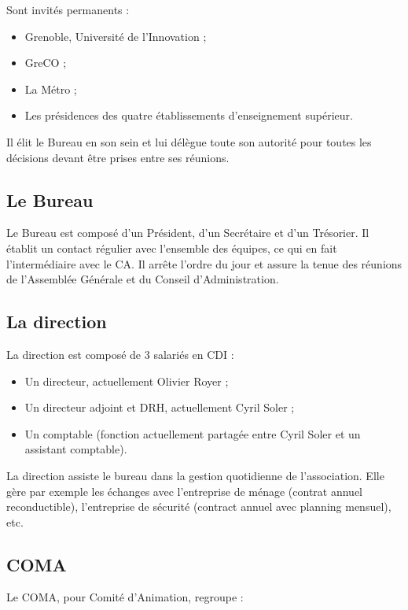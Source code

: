 Sont invités permanents :

\begin{itemize}
\item Grenoble, Université de l'Innovation ;
\item GreCO ;
\item La Métro ;
\item Les présidences des quatre établissements d'enseignement supérieur.
\end{itemize}

Il élit le Bureau en son sein et lui délègue toute son autorité pour toutes les décisions devant être prises entre ses réunions.

\subsection{Le Bureau}
\label{bureau}

Le Bureau est composé d'un Président, d'un Secrétaire et d'un Trésorier.
Il établit un contact régulier avec l'ensemble des équipes, ce qui en fait l'intermédiaire avec le CA. Il arrête l'ordre du jour et assure la tenue des réunions de l'Assemblée Générale et du Conseil d'Administration.

\subsection{La direction}
\label{bureau}

La direction est composé de 3 salariés en CDI :
\begin{itemize}
\item Un directeur, actuellement Olivier Royer ;
\item Un directeur adjoint et DRH, actuellement Cyril Soler ;
\item Un comptable (fonction actuellement partagée entre Cyril Soler et un assistant comptable).
\end{itemize}

La direction assiste le bureau dans la gestion quotidienne de l'association. Elle gère
par exemple les échanges avec l'entreprise de ménage (contrat annuel reconductible),
l'entreprise de sécurité (contract annuel avec planning mensuel), etc.

\subsection{COMA}

Le COMA, pour Comité d'Animation, regroupe :

